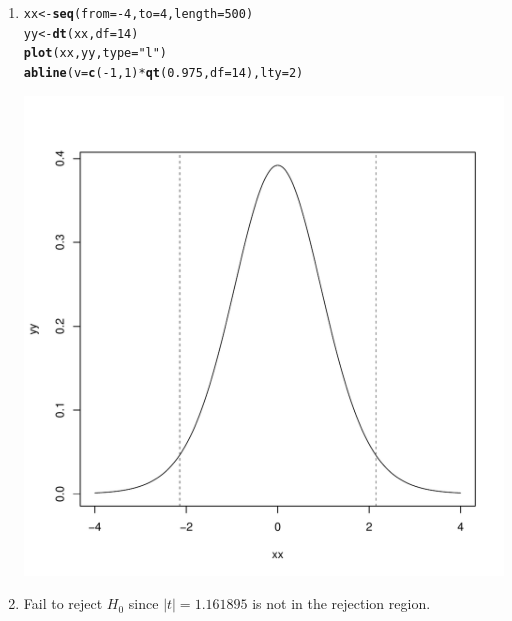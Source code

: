 \documentclass{article}\usepackage[]{graphicx}\usepackage[]{color}
\makeatletter
\def\maxwidth{ %
  \ifdim\Gin@nat@width>\linewidth
    \linewidth
  \else
    \Gin@nat@width
  \fi
}
\newcommand{\hlnum}[1]{\textcolor[rgb]{0.686,0.059,0.569}{#1}}%
\newcommand{\hlstr}[1]{\textcolor[rgb]{0.192,0.494,0.8}{#1}}%
\newcommand{\hlopt}[1]{\textcolor[rgb]{0,0,0}{#1}}%
\newcommand{\hlstd}[1]{\textcolor[rgb]{0.345,0.345,0.345}{#1}}%
\newcommand{\hlkwb}[1]{\textcolor[rgb]{0.69,0.353,0.396}{#1}}%
\newcommand{\hlkwc}[1]{\textcolor[rgb]{0.333,0.667,0.333}{#1}}%
\newcommand{\hlkwd}[1]{\textcolor[rgb]{0.737,0.353,0.396}{\textbf{#1}}}%
\newenvironment{kframe}{%
 \def\at@end@of@kframe{}%
 \ifinner\ifhmode%
  \def\at@end@of@kframe{\end{minipage}}%
  \begin{minipage}{\columnwidth}%
 \fi\fi%
 \def\FrameCommand##1{\hskip\@totalleftmargin \hskip-\fboxsep
 \colorbox{shadecolor}{##1}\hskip-\fboxsep
     \hskip-\linewidth \hskip-\@totalleftmargin \hskip\columnwidth}%
 \MakeFramed {\advance\hsize-\width
   \@totalleftmargin\z@ \linewidth\hsize
   \@setminipage}}%
 {\par\unskip\endMakeFramed%
 \at@end@of@kframe}
\newenvironment{knitrout}{}{} %
\makeatother
\begin{document}
\begin{description}
\begin{enumerate}
    \item 
\begin{knitrout}
\color{fgcolor}\begin{kframe}
\begin{alltt}
\hlstd{xx} \hlkwb{<-} \hlkwd{seq}\hlstd{(}\hlkwc{from} \hlstd{=} \hlopt{-}\hlnum{4}\hlstd{,} \hlkwc{to} \hlstd{=} \hlnum{4}\hlstd{,} \hlkwc{length} \hlstd{=} \hlnum{500}\hlstd{)}
\hlstd{yy} \hlkwb{<-} \hlkwd{dt}\hlstd{(xx,} \hlkwc{df} \hlstd{=} \hlnum{14}\hlstd{)}
\hlkwd{plot}\hlstd{(xx, yy,} \hlkwc{type} \hlstd{=} \hlstr{"l"}\hlstd{)}
\hlkwd{abline}\hlstd{(}\hlkwc{v} \hlstd{=} \hlkwd{c}\hlstd{(}\hlopt{-}\hlnum{1}\hlstd{,} \hlnum{1}\hlstd{)} \hlopt{*} \hlkwd{qt}\hlstd{(}\hlnum{0.975}\hlstd{,} \hlkwc{df} \hlstd{=} \hlnum{14}\hlstd{),} \hlkwc{lty} \hlstd{=} \hlnum{2}\hlstd{)}
\end{alltt}
\end{kframe}
\includegraphics[width=\maxwidth]{figure/unnamed-chunk-12-1} 

\end{knitrout}

    \item Fail to reject $H_0$ since $|t| = 1.161895$ is not in the rejection region.

  \end{enumerate}
  

\end{description}
\end{document}
